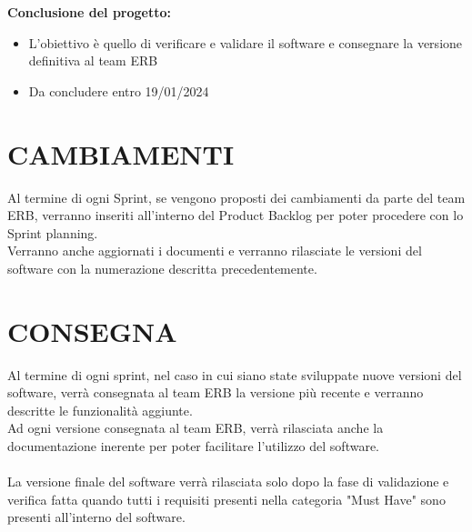 \documentclass{report}
\begin{document}
\textbf{Conclusione del progetto:}
\begin{itemize}
\item L'obiettivo è quello di verificare e validare il software e consegnare la versione definitiva al team ERB
\item Da concludere entro 19/01/2024
\end{itemize}

\chapter{CAMBIAMENTI}
Al termine di ogni Sprint, se vengono proposti dei cambiamenti da parte del team ERB, verranno inseriti all'interno del Product Backlog per poter procedere con lo Sprint planning.\\
Verranno anche aggiornati i documenti e verranno rilasciate le versioni del software con la numerazione descritta precedentemente.

\begingroup
\let\clearpage\relax
\chapter{CONSEGNA}
\endgroup

Al termine di ogni sprint, nel caso in cui siano state sviluppate nuove versioni del software, verrà consegnata al team ERB la versione più recente e verranno descritte le funzionalità aggiunte.\\
Ad ogni versione consegnata al team ERB, verrà rilasciata anche la documentazione inerente per poter facilitare l'utilizzo del software.\\\\
La versione finale del software verrà rilasciata solo dopo la fase di validazione e verifica fatta quando tutti i requisiti presenti nella categoria "Must Have" sono presenti all'interno del software.
\end{document}
